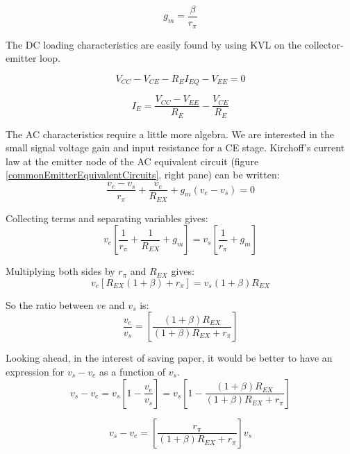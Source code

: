 \documentclass[titlepage, letterpaper, 11pt]{article}
\begin{document}
\begin{equation}
g_{m}=\frac{\beta}{r_{\pi}}
\end{equation}

The DC loading characteristics are easily found by using KVL on the
collector-emitter loop.

\begin{equation*}
V_{CC}-V_{CE}-R_{E}I_{EQ}-V_{EE}=0
\end{equation*}

\begin{equation}
I_{E}=\frac{V_{CC}-V_{EE}}{R_{E}}-\frac{V_{CE}}{R_{E}}
\label{ceDCloadEquation}
\end{equation}

The AC characteristics require a little more algebra. We are
interested in the small signal voltage gain and input resistance
for a CE stage. Kirchoff's current law at the emitter node of the 
AC equivalent circuit (figure \ref{commonEmitterEquivalentCircuits},
right pane) can be written:
\begin{equation*}
\frac{v_{e}-v_{s}}{r_{\pi}}+\frac{v_{e}}{R_{EX}}+g_{m}(v_{e}-v_{s})=0
\end{equation*}

Collecting terms and separating variables gives:
\begin{equation*}
v_{e}\left[\frac{1}{r_{\pi}}+\frac{1}{R_{EX}}+g_{m}\right]
=v_{s}\left[\frac{1}{r_{\pi}}+g_{m}\right]
\end{equation*}

Multiplying both sides by $r_{\pi}$ and $R_{EX}$ gives:
\begin{equation*}
v_{e}[R_{EX}(1+\beta)+r_{\pi}]=v_{s}(1+\beta)R_{EX}
\end{equation*}

So the ratio between $v{e}$ and $v_{s}$ is:
\begin{equation*}
\frac{v_{e}}{v_{s}}=
\left[\frac{(1+\beta)R_{EX}}{(1+\beta)R_{EX}+r_{\pi}}\right]
\end{equation*}

Looking ahead, in the interest of saving paper, it would be better
to have an expression for $v_{s}-v_{e}$ as a function of $v_{s}$.
\begin{equation*}
v_{s}-v_{e}=
v_{s}\left[1-\frac{v_{e}}{v_{s}}\right]=
v_{s}\left[1-\frac{(1+\beta)R_{EX}}{(1+\beta)R_{EX}+r_{\pi}}\right]
\end{equation*}

\begin{equation}
v_{s}-v_{e}=
\left[\frac{r_{\pi}}{(1+\beta)R_{EX}+r_{\pi}}\right]v_{s}
\label{vsMinusVe}
\end{equation}
\end{document}
